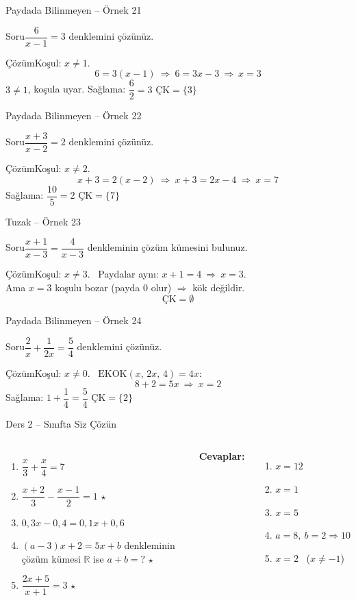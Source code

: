\documentclass[aspectratio=169,11pt]{beamer}
\newcommand{\soru}[3]{%
\begin{frame}{#1}
  \begin{block}{Soru}\large #2\end{block}
  \pause
  \begin{exampleblock}{Çözüm}\large #3\end{exampleblock}
\end{frame}}
\begin{document}
\soru{Paydada Bilinmeyen -- Örnek 21}
{\(\dfrac{6}{x-1}=3\) denklemini çözünüz.}
{Koşul: \(x\neq 1\).
\[6=3(x-1)\ \Rightarrow\ 6=3x-3\ \Rightarrow\ x=3\]
\(3\neq 1\), koşula uyar. Sağlama: \(\dfrac{6}{2}=3\) \checkmark \qquad \(\text{ÇK}=\{3\}\)}

\soru{Paydada Bilinmeyen -- Örnek 22}
{\(\dfrac{x+3}{x-2}=2\) denklemini çözünüz.}
{Koşul: \(x\neq 2\).
\[x+3=2(x-2)\ \Rightarrow\ x+3=2x-4\ \Rightarrow\ x=7\]
Sağlama: \(\dfrac{10}{5}=2\) \checkmark \qquad \(\text{ÇK}=\{7\}\)}

\soru{Tuzak -- Örnek 23}
{\(\dfrac{x+1}{x-3}=\dfrac{4}{x-3}\) denkleminin çözüm kümesini bulunuz.}
{Koşul: \(x\neq 3\). \ Paydalar aynı: \(x+1=4\ \Rightarrow\ x=3\).\\[3pt]
Ama \(x=3\) koşulu bozar (payda \(0\) olur) \(\Rightarrow\) kök değildir.
\[\text{ÇK}=\emptyset\]}

\soru{Paydada Bilinmeyen -- Örnek 24}
{\(\dfrac{2}{x}+\dfrac{1}{2x}=\dfrac{5}{4}\) denklemini çözünüz.}
{Koşul: \(x\neq 0\). \ \(\text{EKOK}(x,\,2x,\,4)=4x\):
\[8+2=5x\ \Rightarrow\ x=2\]
Sağlama: \(1+\dfrac{1}{4}=\dfrac{5}{4}\) \checkmark \qquad \(\text{ÇK}=\{2\}\)}

\begin{frame}{Ders 2 -- Sınıfta Siz Çözün}
\begin{columns}[t]
\begin{enumerate}
\item \(\dfrac{x}{3}+\dfrac{x}{4}=7\)
\item \(\dfrac{x+2}{3}-\dfrac{x-1}{2}=1\) \(\star\)
\item \(0{,}3x-0{,}4=0{,}1x+0{,}6\)
\item \((a-3)x+2=5x+b\) denkleminin çözüm kümesi \(\mathbb{R}\) ise \(a+b=?\) \(\star\)
\item \(\dfrac{2x+5}{x+1}=3\) \(\star\)
\end{enumerate}
\pause
\textbf{Cevaplar:}
\begin{enumerate}
\item \(x=12\)\\[6pt]
\item \(x=1\)\\[6pt]
\item \(x=5\)
\item \(a=8,\ b=2\Rightarrow 10\)\\[6pt]
\item \(x=2\) \ (\(x\neq-1\))
\end{enumerate}
\end{columns}
\vspace{4pt}{\footnotesize \(\star\) işaretli soruların adım adım çözümü sonraki slaytlardadır.}
\end{frame}
\end{document}
